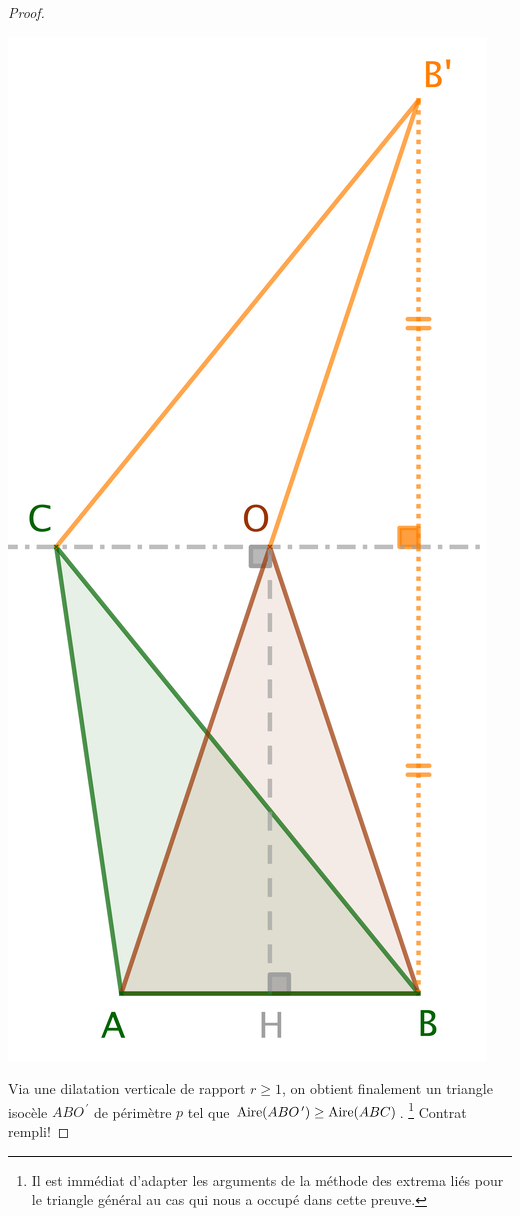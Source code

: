 \begin{proof}
	
	\begin{center}
		\includegraphics[scale=.4]{content/triangle/triangle-proof.png}
	\end{center}
	
	Via une dilatation verticale de rapport $r \geq 1$, on obtient finalement un triangle isocèle $ABO^{\,\prime}$ de périmètre $p$ tel que $\mathrm{Aire}(ABO^{\,\prime}) \geq \mathrm{Aire}(ABC)$.
	\footnote{
		Il est immédiat d'adapter les arguments de la méthode des extrema liés pour le triangle général au cas qui nous a occupé dans cette preuve.
	}
	Contrat rempli!
\end{proof}